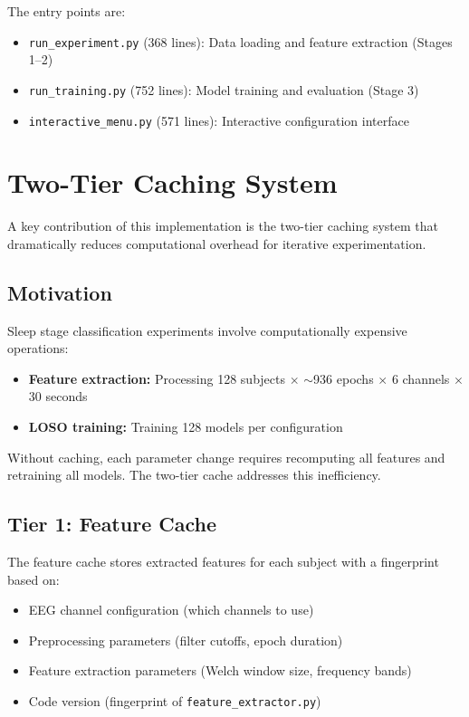 The entry points are:
\begin{itemize}
    \item \texttt{run\_experiment.py} (368 lines): Data loading and feature extraction (Stages 1--2)
    \item \texttt{run\_training.py} (752 lines): Model training and evaluation (Stage 3)
    \item \texttt{interactive\_menu.py} (571 lines): Interactive configuration interface
\end{itemize}

\section{Two-Tier Caching System}
\label{sec:caching}

A key contribution of this implementation is the two-tier caching system that dramatically reduces computational overhead for iterative experimentation.

\subsection{Motivation}
\label{subsec:cache_motivation}

Sleep stage classification experiments involve computationally expensive operations:

\begin{itemize}
    \item \textbf{Feature extraction:} Processing 128 subjects $\times$ $\sim$936 epochs $\times$ 6 channels $\times$ 30 seconds
    \item \textbf{LOSO training:} Training 128 models per configuration
\end{itemize}

Without caching, each parameter change requires recomputing all features and retraining all models. The two-tier cache addresses this inefficiency.

\subsection{Tier 1: Feature Cache}
\label{subsec:feature_cache}

The feature cache stores extracted features for each subject with a fingerprint based on:

\begin{itemize}
    \item EEG channel configuration (which channels to use)
    \item Preprocessing parameters (filter cutoffs, epoch duration)
    \item Feature extraction parameters (Welch window size, frequency bands)
    \item Code version (fingerprint of \texttt{feature\_extractor.py})
\end{itemize}

